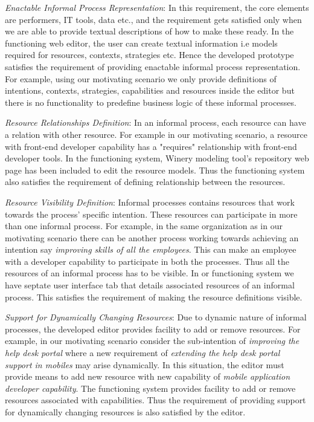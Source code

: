 \textit{Enactable Informal Process Representation}: In this requirement, the core elements are performers, IT tools, data etc., and the requirement gets satisfied only when we are able to provide textual descriptions of how to make these ready. In the functioning web editor, the user can create textual information i.e models required for resources, contexts, strategies etc. Hence the developed prototype satisfies the requirement of providing enactable informal process representation. For example, using our motivating scenario we only provide definitions of intentions, contexts, strategies, capabilities and resources inside the editor but there is no functionality to  predefine business logic of these informal processes.

\textit{Resource Relationships Definition}: In an informal process, each resource can have a relation with other resource. For example in our motivating scenario, a resource with front-end developer capability has a "requires" relationship with front-end developer tools. In the functioning system, Winery modeling tool's repository web page has been included to edit the resource models. Thus the functioning system also satisfies the requirement of defining relationship between the resources. 

\textit{Resource Visibility Definition}: Informal processes contains resources that work towards the process' specific intention. These resources can participate in more than one informal process. For example, in the same organization as in our motivating scenario there can be another process working towards achieving an intention say \textit{improving skills of all the employees}. This can make an employee with a developer capability to participate in both the processes. Thus all the resources of an informal process has to be visible. In or functioning system we have septate user interface tab that details associated resources of an informal process. This satisfies the requirement of making the resource definitions visible.    

\textit{Support for Dynamically Changing Resources}: Due to dynamic nature of informal processes, the developed editor provides facility to add or remove resources. For example, in our motivating scenario consider the sub-intention of \textit{improving the help desk portal} where a new requirement of \textit{extending the help desk portal support in mobiles} may arise dynamically. In this situation, the editor must provide means to add new resource with new capability of \textit{mobile application developer capability}. The functioning system provides facility to add or remove resources associated with capabilities. Thus the requirement of providing support for dynamically changing resources is also satisfied by the editor. 
	


